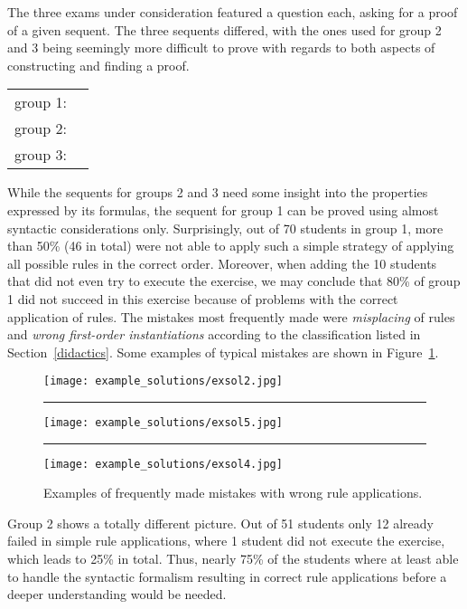 \documentclass[a4paper,UKenglish]{lipics}
\begin{document}
The three exams under consideration featured a question each, asking for a proof of a given sequent. The three sequents differed, 
with the ones used for group 2 and 3 being seemingly more difficult to prove with regards to both aspects of constructing and finding a proof. 
\begin{center}
\begin{tabular}{ll}
group 1: &  \\
group 2: &  \\
group 3: &  
\end{tabular}
\end{center}
While the sequents for groups 2 and 3 need some insight into the properties expressed by its formulas, the sequent for group 1 can be proved using almost
syntactic considerations only. Surprisingly, out of 70 students in group 1, more than 50\% (46 in total) were not able to apply such a simple strategy of
applying all possible rules in the correct order. Moreover, when adding the 10 students that did not even try to execute the exercise, we may conclude
that 80\% of group 1 did not succeed in this exercise because of problems with the correct application of rules. The mistakes most frequently made
were \emph{misplacing} of rules and \emph{wrong first-order instantiations} according to the classification listed in Section~\ref{didactics}. Some examples of typical mistakes are shown in Figure~\ref{fig:solutions}.
\begin{figure}
\begin{center}
\texttt{[image: example\_solutions/exsol2.jpg]}
\vspace*{.5em}
\rule{\textwidth}{.5pt}

\vspace*{.5em}
\texttt{[image: example\_solutions/exsol5.jpg]}
\vspace*{.5em}
\rule{\textwidth}{.5pt}

\vspace*{.5em}
\texttt{[image: example\_solutions/exsol4.jpg]}
\end{center}
\caption{Examples of frequently made mistakes with wrong rule applications.}
\label{fig:solutions}
\end{figure}

Group 2 shows a totally different picture. 
Out of 51 students only 12 already failed in simple rule applications, where 1 student did not execute the exercise, which leads to 25\% in total. Thus,
nearly 75\% of the students where at least able to handle the syntactic formalism resulting in correct rule applications before a deeper 
understanding would be needed. 
\end{document}
